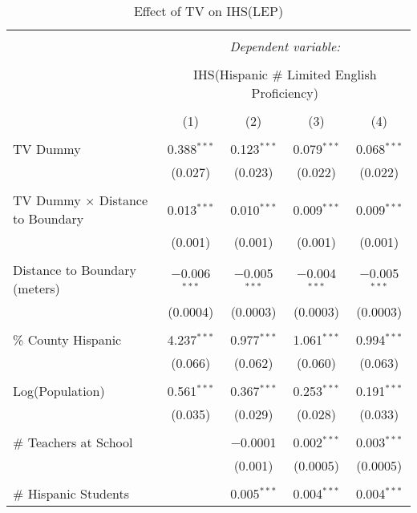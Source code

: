 
\begin{table}[!htbp] \centering 
  \caption{Effect of TV on IHS(LEP)} 
  \label{} 
\begin{tabular}{@{\extracolsep{-2pt}}lcccc} 
\\[-1.8ex]\hline 
\hline \\[-1.8ex] 
 & \multicolumn{4}{c}{\textit{Dependent variable:}} \\ 
\cline{2-5} 
\\[-1.8ex] & \multicolumn{4}{c}{IHS(Hispanic \# Limited English Proficiency)} \\ 
\\[-1.8ex] & (1) & (2) & (3) & (4)\\ 
\hline \\[-1.8ex] 
 TV Dummy & 0.388$^{***}$ & 0.123$^{***}$ & 0.079$^{***}$ & 0.068$^{***}$ \\ 
  & (0.027) & (0.023) & (0.022) & (0.022) \\ 
  & & & & \\ 
 TV Dummy $\times$ Distance to Boundary & 0.013$^{***}$ & 0.010$^{***}$ & 0.009$^{***}$ & 0.009$^{***}$ \\ 
  & (0.001) & (0.001) & (0.001) & (0.001) \\ 
  & & & & \\ 
 Distance to Boundary (meters) & $-$0.006$^{***}$ & $-$0.005$^{***}$ & $-$0.004$^{***}$ & $-$0.005$^{***}$ \\ 
  & (0.0004) & (0.0003) & (0.0003) & (0.0003) \\ 
  & & & & \\ 
 \% County Hispanic & 4.237$^{***}$ & 0.977$^{***}$ & 1.061$^{***}$ & 0.994$^{***}$ \\ 
  & (0.066) & (0.062) & (0.060) & (0.063) \\ 
  & & & & \\ 
 Log(Population) & 0.561$^{***}$ & 0.367$^{***}$ & 0.253$^{***}$ & 0.191$^{***}$ \\ 
  & (0.035) & (0.029) & (0.028) & (0.033) \\ 
  & & & & \\ 
 \# Teachers at School &  & $-$0.0001 & 0.002$^{***}$ & 0.003$^{***}$ \\ 
  &  & (0.001) & (0.0005) & (0.0005) \\ 
  & & & & \\ 
 \# Hispanic Students &  & 0.005$^{***}$ & 0.004$^{***}$ & 0.004$^{***}$ \\ 

\end{tabular}
\end{table}
